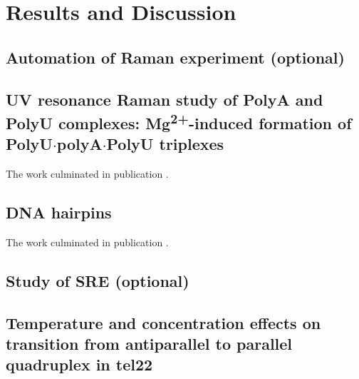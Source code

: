 \chapter{Results and Discussion}





\section{Automation of Raman experiment (optional)}






\section[\texorpdfstring{%
    UV resonance Raman study of PolyA and PolyU complexes:\\
		Mg\textsuperscript{2+}\babelhyphen{nobreak}induced formation of
		PolyU$\cdot$polyA$\cdot$PolyU triplexes
}{%
    UV resonance Raman study of PolyA and PolyU complexes:
		Mg\texttwosuperior\textplussuperior-induced formation of PolyU·polyA·PolyU
		triplexes
}]{%
    UV resonance Raman study of PolyA and PolyU complexes:
		Mg\textsuperscript{2+}-induced formation of PolyU$\cdot$polyA$\cdot$PolyU
		triplexes
}%

The work culminated in publication \textcite{Klener2015}.

\section{DNA hairpins}

The work culminated in publication \textcite{Klener2021}.

\section{Study of SRE (optional)}

\section[%
	Temperature and concentration effects on transition from antiparallel	to
	parallel quadruplex in tel22 (optional)
]{%
	Temperature and concentration effects on transition from antiparallel to
	parallel\\quadruplex in tel22}
